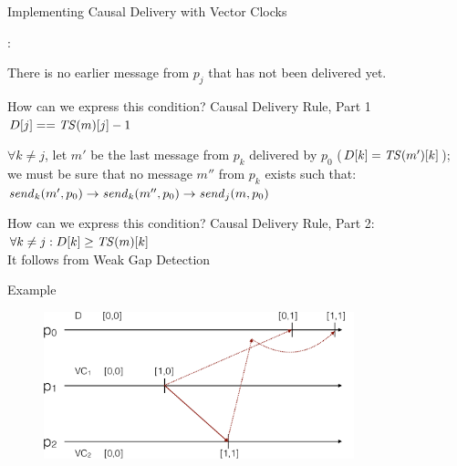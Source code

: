 

\begin{frame}{Implementing Causal Delivery with Vector Clocks}

:

\BIL

\item There is no earlier message from $p_j$ that has not been delivered yet.
\begin{overprint}
 \alert{How can we express this condition?}
  \alert{Causal Delivery Rule, Part 1}  $D[j] == \mathit{TS}(m)[j] -1$
\end{overprint}

\item $\forall k \neq j$, let $m'$ be the last message from $p_k$ delivered by $p_0$ ($D[k] = \mathit{TS}(m')[k]$); 
we must be sure that no message $m''$ from $p_k$ exists such that:
$
\mathit{send}_k(m',p_0) \rightarrow \mathit{send}_k(m'',p_0) \rightarrow \mathit{send}_j(m,p_0)
$
\begin{overprint}
  \alert{How can we express this condition?}
\alert{Causal Delivery Rule, Part 2}: $\forall k \neq j: D[k] \geq \mathit{TS}(m)[k]$\\
It follows from Weak Gap Detection
\end{overprint}

\EIL

\end{frame}

\begin{frame}{Example}
\begin{figure} 
\includegraphics[width=9cm]{figs/03/diagram8}
\end{figure}
\end{frame}

